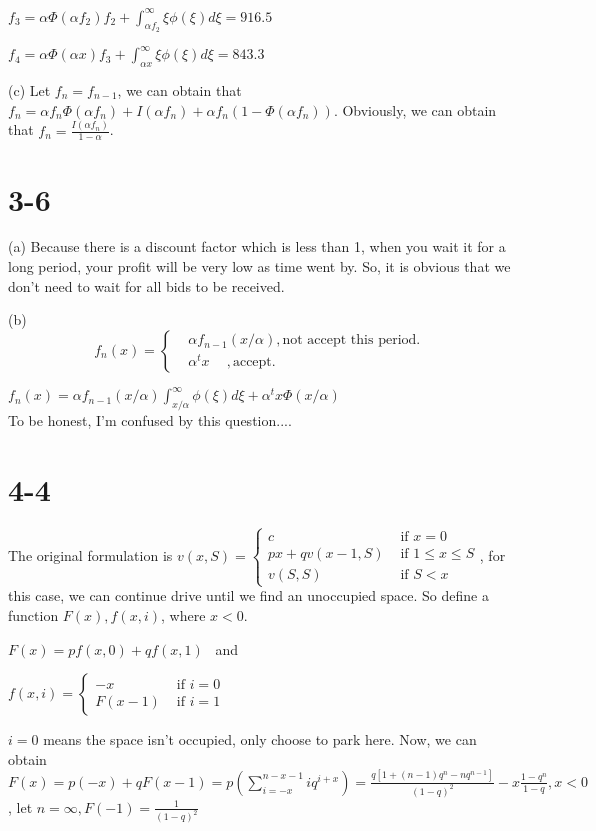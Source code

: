 \documentclass[UTF8]{article}
\begin{document}
$f_3 = \alpha \Phi(\alpha f_2) f_2 + \int_{\alpha f_2}^{\infty}\xi \phi(\xi) d \xi = 916.5$

$f_4 = \alpha \Phi(\alpha x) f_3 + \int_{\alpha x}^{\infty}\xi \phi(\xi) d \xi = 843.3$

(c) Let $f_n = f_{n-1}$, we can obtain that
$f_n = \alpha f_n \Phi(\alpha f_n) + I(\alpha f_n)+ \alpha f_n (1-\Phi(\alpha f_n))$.
Obviously, we can obtain that $f_n = \frac{I(\alpha f_n)}{1-\alpha}$.

\section*{3-6}

(a) Because there is a discount factor which is less than 1, when you wait it for a long period, your profit will be very low as time went by. So, it is obvious that we don't need to wait for all bids to be received.

(b)
$$ f_n(x)=\left\{
\begin{aligned}
& \alpha f_{n-1}(x/\alpha), \text{not accept this period}.  \\
& \alpha^t x ~\quad, \text{accept}.
\end{aligned}
\right.
$$

$f_n(x) = \alpha f_{n-1}(x/\alpha) \int_{x/\alpha}^{\infty} \phi(\xi) d \xi + \alpha^t x \Phi(x/\alpha)$ \\
To be honest, I'm confused by this question....

\section*{4-4}
The original formulation is
$v(x, S)=\left\{\begin{array}{ll}c & \text { if } x=0 \\ p x+q v(x-1, S) & \text { if } 1 \leq x \leq S \\ v(S, S) & \text { if } S<x\end{array}\right.$,
for this case, we can continue drive until we find an unoccupied space. So define a function $F(x),f(x,i)$, where $x<0$.

$F(x) = pf(x,0)+qf(x,1)$ ~and

$f(x, i)=\left\{\begin{array}{ll}
-x & \text { if } i=0 \\
F(x-1) & \text { if } i=1
\end{array}\right.$

$i= 0$ means the space isn't occupied, only choose to park here.
Now, we can obtain $F(x) = p(-x)+qF(x-1) = p(\sum_{i=-x}^{n-x-1} iq^{i+x}) = \frac{q[1+(n-1)q^n-nq^{n-1}]}{(1-q)^2}-x\frac{1-q^n}{1-q}
, x<0$, let $n = \infty,F(-1) = \frac{1}{(1-q)^2}$
\end{document}
